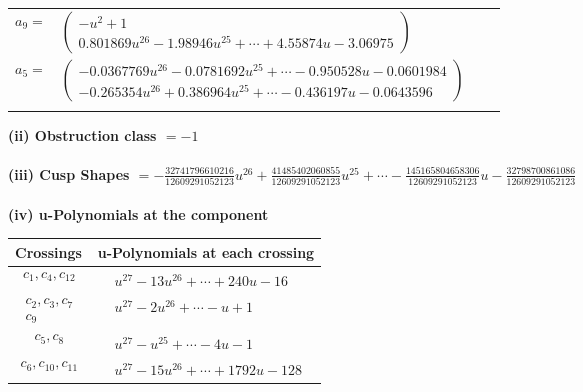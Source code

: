 \documentclass[1p]{elsarticle_modified}
\theoremstyle{definition}
\begin{document}
\begin{tabular}{m{7pt} m{180pt} m{7pt} m{180pt} }
\flushright $a_{9}=$&$\begin{pmatrix}- u^2+1\\0.801869 u^{26}-1.98946 u^{25}+\cdots+4.55874 u-3.06975\end{pmatrix}$ \\
\flushright $a_{5}=$&$\begin{pmatrix}-0.0367769 u^{26}-0.0781692 u^{25}+\cdots-0.950528 u-0.0601984\\-0.265354 u^{26}+0.386964 u^{25}+\cdots-0.436197 u-0.0643596\end{pmatrix}$\\&\end{tabular}
\flushleft \textbf{(ii) Obstruction class $= -1$}\\~\\
\flushleft \textbf{(iii) Cusp Shapes $= -\frac{32741796610216}{12609291052123} u^{26}+\frac{41485402060855}{12609291052123} u^{25}+\cdots-\frac{145165804658306}{12609291052123} u-\frac{32798700861086}{12609291052123}$}\\~\\
\newpage\renewcommand{\arraystretch}{1}
\flushleft \textbf{(iv) u-Polynomials at the component}\newline \\
\begin{tabular}{m{50pt}|m{274pt}}
Crossings & \hspace{64pt}u-Polynomials at each crossing \\
\hline $$\begin{aligned}c_{1},c_{4},c_{12}\end{aligned}$$&$\begin{aligned}
&u^{27}-13 u^{26}+\cdots+240 u-16
\end{aligned}$\\
\hline $$\begin{aligned}c_{2},c_{3},c_{7}\\c_{9}\end{aligned}$$&$\begin{aligned}
&u^{27}-2 u^{26}+\cdots- u+1
\end{aligned}$\\
\hline $$\begin{aligned}c_{5},c_{8}\end{aligned}$$&$\begin{aligned}
&u^{27}- u^{25}+\cdots-4 u-1
\end{aligned}$\\
\hline $$\begin{aligned}c_{6},c_{10},c_{11}\end{aligned}$$&$\begin{aligned}
&u^{27}-15 u^{26}+\cdots+1792 u-128
\end{aligned}$\\
\hline
\end{tabular}\\~\\
\end{document}
